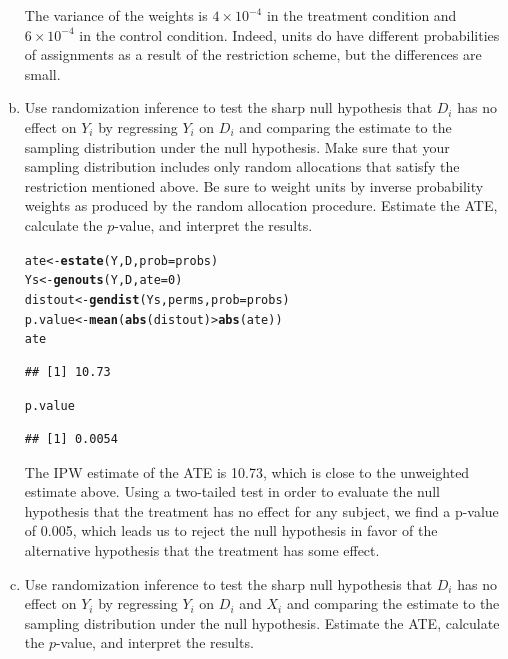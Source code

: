 \documentclass[11pt,notitlepage]{article}\usepackage[]{graphicx}\usepackage[]{color}
\makeatletter
\newcommand{\hlnum}[1]{\textcolor[rgb]{0.686,0.059,0.569}{#1}}%
\newcommand{\hlopt}[1]{\textcolor[rgb]{0,0,0}{#1}}%
\newcommand{\hlstd}[1]{\textcolor[rgb]{0.345,0.345,0.345}{#1}}%
\newcommand{\hlkwb}[1]{\textcolor[rgb]{0.69,0.353,0.396}{#1}}%
\newcommand{\hlkwc}[1]{\textcolor[rgb]{0.333,0.667,0.333}{#1}}%
\newcommand{\hlkwd}[1]{\textcolor[rgb]{0.737,0.353,0.396}{\textbf{#1}}}%
\newenvironment{kframe}{%
 \def\at@end@of@kframe{}%
 \ifinner\ifhmode%
  \def\at@end@of@kframe{\end{minipage}}%
  \begin{minipage}{\columnwidth}%
 \fi\fi%
 \def\FrameCommand##1{\hskip\@totalleftmargin \hskip-\fboxsep
 \colorbox{shadecolor}{##1}\hskip-\fboxsep
     \hskip-\linewidth \hskip-\@totalleftmargin \hskip\columnwidth}%
 \MakeFramed {\advance\hsize-\width
   \@totalleftmargin\z@ \linewidth\hsize
   \@setminipage}}%
 {\par\unskip\endMakeFramed%
 \at@end@of@kframe}
\newenvironment{knitrout}{}{} %
\makeatother
\begin{document}
\begin{enumerate}[a)]
The variance of the weights is \ensuremath{4\times 10^{-4}} in the treatment condition and \ensuremath{6\times 10^{-4}} in the control condition. Indeed, units do have different probabilities of assignments as a result of the restriction scheme, but the differences are small.

\item Use randomization inference to test the sharp null hypothesis that $D_i$ has no effect on $Y_i$ by regressing $Y_i$ on $D_i$ and comparing the estimate to the sampling distribution under the null hypothesis. Make sure that your sampling distribution includes only random allocations that satisfy the restriction mentioned above. Be sure to weight units by inverse probability weights as produced by the random allocation procedure. Estimate the ATE, calculate the $p$-value, and interpret the results.

\begin{knitrout}
\color{fgcolor}\begin{kframe}
\begin{alltt}
\hlstd{ate} \hlkwb{<-} \hlkwd{estate}\hlstd{(Y,D,}\hlkwc{prob}\hlstd{=probs)}
\hlstd{Ys} \hlkwb{<-} \hlkwd{genouts}\hlstd{(Y,D,}\hlkwc{ate}\hlstd{=}\hlnum{0}\hlstd{)}
\hlstd{distout} \hlkwb{<-} \hlkwd{gendist}\hlstd{(Ys,perms,}\hlkwc{prob}\hlstd{=probs)}
\hlstd{p.value} \hlkwb{<-} \hlkwd{mean}\hlstd{(}\hlkwd{abs}\hlstd{(distout)} \hlopt{>} \hlkwd{abs}\hlstd{(ate))}
\hlstd{ate}
\end{alltt}
\begin{verbatim}
## [1] 10.73
\end{verbatim}
\begin{alltt}
\hlstd{p.value}
\end{alltt}
\begin{verbatim}
## [1] 0.0054
\end{verbatim}
\end{kframe}
\end{knitrout}


The IPW estimate of the ATE is 10.73, which is close to the unweighted estimate above.  Using a two-tailed test in order to evaluate the null hypothesis that the treatment has no effect for any subject, we find a p-value of 0.005, which leads us to reject the null hypothesis in favor of the alternative hypothesis that the treatment has some effect. 

\item Use randomization inference to test the sharp null hypothesis that $D_i$ has no effect on $Y_i$ by regressing $Y_i$ on $D_i$ and $X_i$ and comparing the estimate to the sampling distribution under the null hypothesis.  Estimate the ATE, calculate the $p$-value, and interpret the results. 



\end{enumerate}
\end{document}
